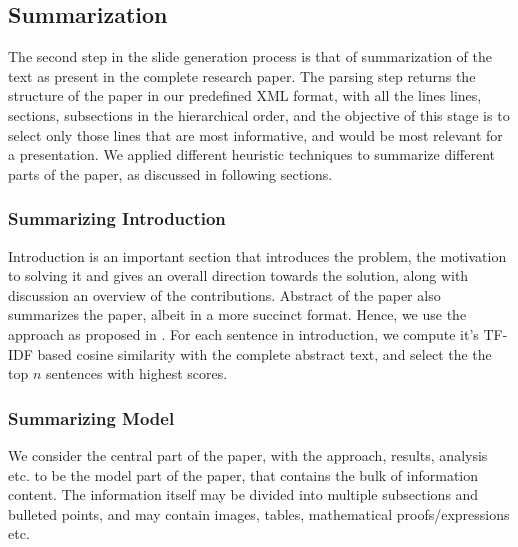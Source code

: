 \subsection{Summarization}

The second step in the slide generation process is that of summarization of the text
as present in the complete research paper. The parsing step returns the structure of
the paper in our predefined XML format, with all the lines lines, sections, subsections
in the hierarchical order, and the objective of this stage is to select only those lines
that are most informative, and would be most relevant for a presentation. We applied 
different heuristic techniques to summarize different parts of the paper, as discussed
in following sections.

\subsubsection{Summarizing Introduction}
Introduction is an important section that introduces the problem, the motivation to solving it
and gives an overall direction towards the solution, along with discussion an overview of
the contributions. Abstract of the paper also summarizes the paper, albeit in a more succinct 
format. Hence, we use the approach as proposed in \cite{sravanthi}. For each sentence 
in introduction, we compute it's TF-IDF based cosine similarity with the complete abstract
text, and select the the top $n$ sentences with highest scores.

\subsubsection{Summarizing Model}
We consider the central part of the paper, with the approach, results, analysis etc.
to be the model part of the paper, that contains the bulk of information content.
The information itself may be divided into multiple subsections and bulleted points,
and may contain images, tables, mathematical proofs/expressions etc.

